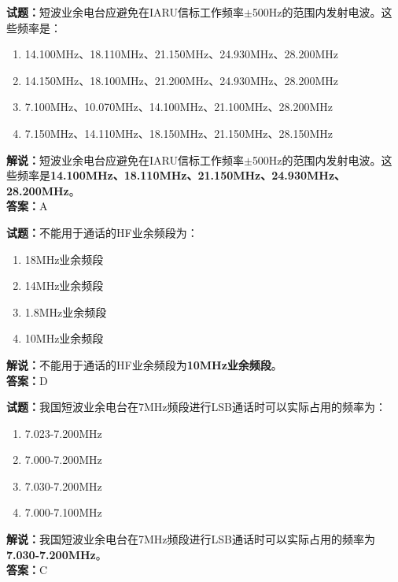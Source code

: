 \documentclass{ctexbook}
\begin{document}
\bigskip




\noindent\textbf{试题：}短波业余电台应避免在IARU信标工作频率$\pm$500Hz的范围内发射电波。这些频率是：%
\begin{enumerate}[leftmargin=3em]
\item 14.100\unit{\MHz}、18.110\unit{\MHz}、21.150\unit{\MHz}、24.930\unit{\MHz}、28.200\unit{\MHz}
\item 14.150\unit{\MHz}、18.100\unit{\MHz}、21.200\unit{\MHz}、24.930\unit{\MHz}、28.200\unit{\MHz}
\item 7.100\unit{\MHz}、10.070\unit{\MHz}、14.100\unit{\MHz}、21.100\unit{\MHz}、28.200\unit{\MHz}
\item 7.150\unit{\MHz}、14.110\unit{\MHz}、18.150\unit{\MHz}、21.150\unit{\MHz}、28.150\unit{\MHz}
\end{enumerate}
\noindent\textbf{解说：}短波业余电台应避免在IARU信标工作频率$\pm$500Hz的范围内发射电波。这些频率是\textbf{14.100\unit{\MHz}、18.110\unit{\MHz}、21.150\unit{\MHz}、24.930\unit{\MHz}、28.200\unit{\MHz}}。\\\noindent\textbf{答案：}A%

\bigskip




\noindent\textbf{试题：}不能用于通话的HF业余频段为：
\begin{enumerate}[leftmargin=3em]
\item 18\unit{\MHz}业余频段
\item 14\unit{\MHz}业余频段
\item 1.8\unit{\MHz}业余频段
\item 10\unit{\MHz}业余频段
\end{enumerate}
\noindent\textbf{解说：}不能用于通话的HF业余频段为\textbf{10\unit{\MHz}业余频段}。\\\noindent\textbf{答案：}D

\bigskip




\noindent\textbf{试题：}我国短波业余电台在7\unit{\MHz}频段进行LSB通话时可以实际占用的频率为：
\begin{enumerate}[leftmargin=3em]
\item 7.023-7.200\unit{\MHz}
\item 7.000-7.200\unit{\MHz}
\item 7.030-7.200\unit{\MHz}
\item 7.000-7.100\unit{\MHz}
\end{enumerate}
\noindent\textbf{解说：}我国短波业余电台在7\unit{\MHz}频段进行LSB通话时可以实际占用的频率为\textbf{7.030-7.200\unit{\MHz}}。\\\noindent\textbf{答案：}C
\end{document}
